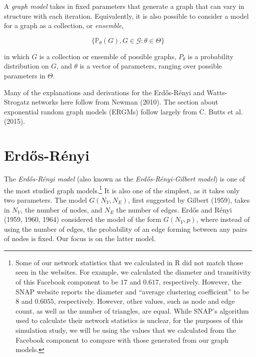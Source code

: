 \documentclass[12pt,twoside]{amherstthesis}
\begin{document}
  A \emph{graph model} takes in fixed parameters that generate a graph
  that can vary in structure with each iteration. Equivalently, it is also
  possible to consider a model for a graph as a collection, or
  \emph{ensemble},
  
  \[\{\mathbb{P}_{\theta}(G), G \in \mathcal{G}: \theta \in \Theta\}\]
  
  in which \(G\) is a collection or ensemble of possible graphs,
  \(P_\theta\) is a probability distribution on \(G\), and \(\theta\) is a
  vector of parameters, ranging over possible parameters in \(\Theta\).
  
  Many of the explanations and derivations for the Erdős-Rényi and
  Watts-Strogatz networks here follow from Newman (2010). The section
  about exponential random graph models (ERGMs) follow largely from C.
  Butts et al. (2015).
  
  \section{Erdős-Rényi}\label{erdos-renyi}
  
  The \emph{Erdős-Rényi model} (also known as the
  \emph{Erdős-Rényi-Gilbert model}) is one of the most studied graph
  models.\footnote{Some of our network statistics that we calculated in R
    did not match those seen in the websites. For example, we calculated
    the diameter and transitivity of this Facebook component to be \(17\)
    and \(0.617\), respectively. However, the SNAP website reports the
    diameter and ``average clustering coefficient'' to be \(8\) and
    \(0.6055\), respectively. However, other values, such as node and edge
    count, as well as the number of triangles, are equal. While SNAP's
    algorithm used to calculate their network statistics is unclear, for
    the purposes of this simulation study, we will be using the values
    that we calculated from the Facebook component to compare with those
    generated from our graph models.} It is also one of the simplest, as
  it takes only two parameters. The model \(G(N_V, N_E)\), first suggested
  by Gilbert (1959), takes in \(N_V\), the number of nodes, and \(N_E\)
  the number of edges. Erdős and Rényi (1959, 1960, 1964) considered the
  model of the form \(G(N_{V}, p)\), where instead of using the number of
  edges, the probability of an edge forming between any pairs of nodes is
  fixed. Our focus is on the latter model.
  
\end{document}
